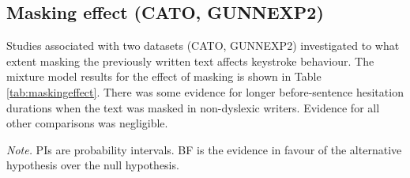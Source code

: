 \clearpage
\makeatletter
\efloat@restorefloats
\makeatother


\begin{appendix}
\section{}
\hypertarget{masking-effect-cato-gunnexp2}{%
\subsection{Masking effect (CATO,
GUNNEXP2)}\label{masking-effect-cato-gunnexp2}}

Studies associated with two datasets (CATO, GUNNEXP2) investigated to
what extent masking the previously written text affects keystroke
behaviour. The mixture model results for the effect of masking is shown
in Table \ref{tab:maskingeffect}. There was some evidence for longer
before-sentence hesitation durations when the text was masked in
non-dyslexic writers. Evidence for all other comparisons was negligible.

\blandscape

\begin{center}
\begin{ThreePartTable}

\begin{TableNotes}[para]
\normalsize{\textit{Note.} PIs are probability intervals. BF is the evidence in favour of the alternative hypothesis over the null hypothesis.}
\end{TableNotes}

\footnotesize{

}
\end{ThreePartTable}
\end{center}
\end{appendix}
